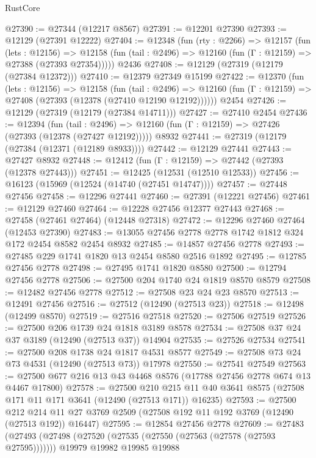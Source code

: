 \begin{lexlean}{RustCore}
\begin{coremodule}
@27390 := @27344 (@12217 @8567)
@27391 := @12201 @27390
@27393 := @12129 (@27391 @12222)
@27404 := @12348
    (fun (rty : @2266) =>
    @12157
      (fun (lets : @12156) =>
      @12158 (fun (tail : @2496) => @12160 (fun (Γ : @12159) => @27388 (@27393 @27354)))))
    @2436
@27408 := @12129 (@27319 (@12179 (@27384 @12372)))
@27410 := @12379 @27349 @15199
@27422 := @12370
    (fun (lets : @12156) =>
    @12158
      (fun (tail : @2496) =>
      @12160 (fun (Γ : @12159) => @27408 (@27393 (@12378 (@27410 @12190 @12192))))))
    @2454
@27426 := @12129 (@27319 (@12179 (@27384 @14711)))
@27427 := @27410 @2454
@27436 := @12394
    (fun (tail : @2496) => @12160 (fun (Γ : @12159) => @27426 (@27393 (@12378 (@27427 @12192)))))
    @8932
@27441 := @27319 (@12179 (@27384 (@12371 (@12189 @8933))))
@27442 := @12129 @27441
@27443 := @27427 @8932
@27448 := @12412 (fun (Γ : @12159) => @27442 (@27393 (@12378 @27443)))
@27451 := @12425 (@12531 (@12510 @12533))
@27456 := @16123 (@15969 (@12524 (@14740 (@27451 @14747))))
@27457 := @27448 @27456
@27458 := @12296 @27441
@27460 := @27391 (@12221 @27456)
@27461 := @12129 @27460
@27464 := @12228 @27456 @12377 @27443
@27468 := @27458 (@27461 @27464) (@12448 @27318)
@27472 := @12296 @27460 @27464 (@12453 @27390)
@27483 := @13055 @27456 @2778 @2778 @1742 @1812 @324 @172 @2454 @8582 @2454 @8932
@27485 := @14857 @27456 @2778
@27493 := @27485 @229 @1741 @1820 @13 @2454 @8580 @2516 @1892
@27495 := @12785 @27456 @2778
@27498 := @27495 @1741 @1820 @8580
@27500 := @12794 @27456 @2778
@27506 := @27500 @204 @1740 @24 @1819 @8570 @8579
@27508 := @12482 @27456 @2778
@27512 := @27508 @23 @24 @23 @8570
@27513 := @12491 @27456
@27516 := @27512 (@12490 (@27513 @23))
@27518 := @12498 (@12499 @8570)
@27519 := @27516 @27518
@27520 := @27506 @27519
@27526 := @27500 @206 @1739 @24 @1818 @3189 @8578
@27534 := @27508 @37 @24 @37 @3189 (@12490 (@27513 @37)) @14904
@27535 := @27526 @27534
@27541 := @27500 @208 @1738 @24 @1817 @4531 @8577
@27549 := @27508 @73 @24 @73 @4531 (@12490 (@27513 @73)) @17978
@27550 := @27541 @27549
@27563 := @27500 @677 @216 @13 @43 @4468 @8576 (@17788 @27456 @2778 @674 @13 @4467 @17800)
@27578 := @27500
    @210
    @215
    @11
    @40
    @3641
    @8575
    (@27508 @171 @11 @171 @3641 (@12490 (@27513 @171)) @16235)
@27593 := @27500
    @212
    @214
    @11
    @27
    @3769
    @2509
    (@27508 @192 @11 @192 @3769 (@12490 (@27513 @192)) @16447)
@27595 := @12854 @27456 @2778
@27609 := @27483
    (@27493
      (@27498 (@27520 (@27535 (@27550 (@27563 (@27578 (@27593 @27595)))))))
      @19979
      @19982
      @19985
      @19988

\end{coremodule}
\end{lexlean}
